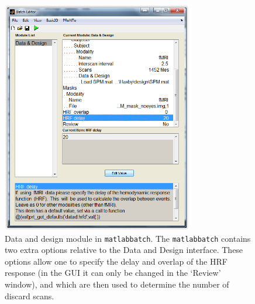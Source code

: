 \begin{figure}[!h]
  \begin{center}
      \includegraphics[height=4in]{images/Figure9.png}
   \caption{Data and design module in {\tt matlabbatch}. The {\tt matlabbatch} contains two extra options relative to the Data and Design interface. These options allow one to specify the delay and overlap of the HRF response (in the GUI it can only be changed in the `Review' window), and which are then used to determine the number of discard scans.}
    \label{Fig2.9}
  \end{center}
\end{figure}
